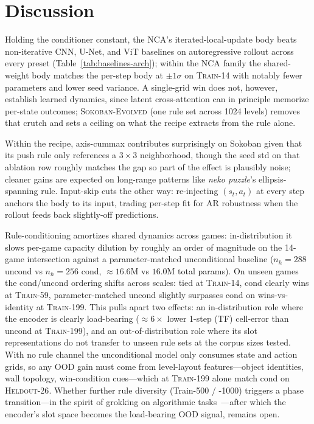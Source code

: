 \section{Discussion}
\label{sec:discussion}

Holding the conditioner constant, the NCA's iterated-local-update body beats non-iterative CNN, U-Net, and ViT baselines on autoregressive rollout across every preset (Table~\ref{tab:baselines-arch}); within the NCA family the shared-weight body matches the per-step body at $\pm 1\sigma$ on \textsc{Train-14} with notably fewer parameters and lower seed variance.
A single-grid win does not, however, establish learned dynamics, since latent cross-attention can in principle memorize per-state outcomes; \textsc{Sokoban-Evolved} (one rule set across 1024 levels) removes that crutch and sets a ceiling on what the recipe extracts from the rule alone.

Within the recipe, axis-cummax contributes surprisingly on Sokoban given that its push rule only references a $3{\times}3$ neighborhood, though the seed std on that ablation row roughly matches the gap so part of the effect is plausibly noise; cleaner gains are expected on long-range patterns like \textit{neko puzzle}'s ellipsis-spanning rule.
Input-skip cuts the other way: re-injecting $(s_t, a_t)$ at every step anchors the body to its input, trading per-step fit for AR robustness when the rollout feeds back slightly-off predictions.

Rule-conditioning amortizes shared dynamics across games: in-distribution it slows per-game capacity dilution by roughly an order of magnitude on the 14-game intersection against a parameter-matched unconditional baseline ($n_h{=}288$ uncond vs $n_h{=}256$ cond, $\approx 16.6$M vs $16.0$M total params).
On unseen games the cond/uncond ordering shifts across scales: tied at \textsc{Train-14}, cond clearly wins at \textsc{Train-59}, parameter-matched uncond slightly surpasses cond on wins-vs-identity at \textsc{Train-199}.
This pulls apart two effects: an in-distribution role where the encoder is clearly load-bearing ($\approx 6\times$ lower 1-step (TF) cell-error than uncond at \textsc{Train-199}), and an out-of-distribution role where its slot representations do not transfer to unseen rule sets at the corpus sizes tested.
With no rule channel the unconditional model only consumes state and action grids, so any OOD gain must come from level-layout features---object identities, wall topology, win-condition cues---which at \textsc{Train-199} alone match cond on \textsc{Heldout-26}.
Whether further rule diversity (Train-500 / -1000) triggers a phase transition---in the spirit of grokking on algorithmic tasks~\cite{power2022grokking,nanda2023progress}---after which the encoder's slot space becomes the load-bearing OOD signal, remains open.
